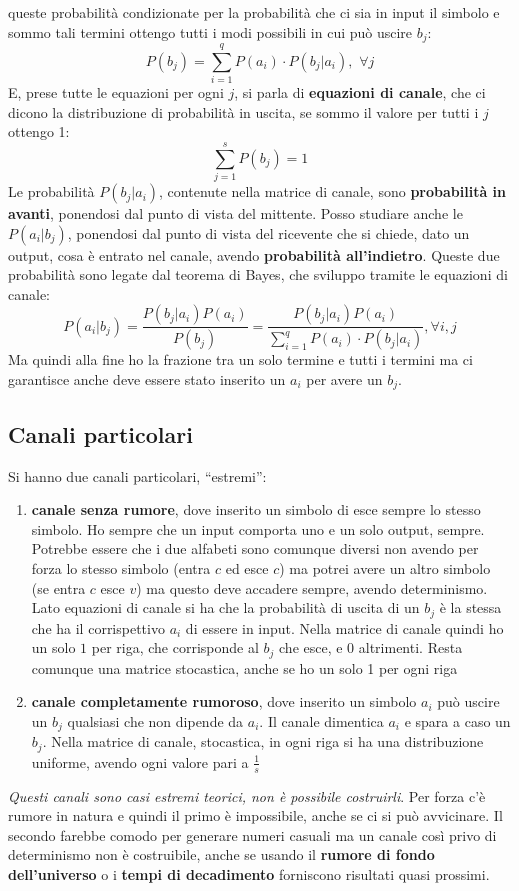 \documentclass[a4paper,12pt, oneside]{book}
\begin{document}
queste probabilità condizionate per la probabilità che ci sia in input il
simbolo e sommo tali termini ottengo tutti i modi possibili in cui può uscire
$b_j$:
\[P(b_j)=\sum_{i=1}^q P(a_i)\cdot P(b_j|a_i),\,\,\forall j\]
E, prese tutte le equazioni per ogni $j$, si parla di \textbf{equazioni di
  canale}, che ci dicono la distribuzione di probabilità in uscita, se sommo il
valore per tutti i $j$ ottengo 1:
\[\sum_{j=1}^s P(b_j)=1\]
Le probabilità $P(b_j|a_i)$, contenute nella matrice di canale, sono
\textbf{probabilità in avanti}, ponendosi dal punto di vista del mittente. Posso
studiare anche le $P(a_i|b_j)$, ponendosi dal 
punto di vista del ricevente che si chiede, dato un output, cosa è entrato nel
canale, avendo \textbf{probabilità all'indietro}. Queste due probabilità
sono legate dal teorema di Bayes, che sviluppo tramite le equazioni di canale:
\[P(a_i|b_j)=\frac{P(b_j|a_i)P(a_i)}{P(b_j)}=\frac{P(b_j|a_i)P(a_i)}{\sum_{i=1}^q
    P(a_i)\cdot P(b_j|a_i)},\forall i,j\]
Ma quindi alla fine ho la frazione tra un solo termine e tutti i termini ma ci
garantisce anche deve essere stato inserito un $a_i$ per avere un $b_j$.
\subsection{Canali particolari}
Si hanno due canali particolari, ``estremi'':
\begin{enumerate}
  \item \textbf{canale senza rumore}, dove inserito un simbolo di esce
  sempre lo stesso simbolo. Ho sempre che un input comporta uno e un solo
  output, sempre. Potrebbe essere che i due alfabeti sono comunque diversi non
  avendo per forza lo stesso simbolo (entra $c$ ed esce $c$) ma potrei avere un
  altro simbolo (se entra $c$ esce $v$) ma questo deve accadere sempre, avendo
  determinismo. Lato equazioni di canale si ha che la probabilità di uscita di 
  un $b_j$ è la stessa che ha il corrispettivo $a_i$ di essere in input. Nella
  matrice di canale quindi ho un solo $1$ per riga, che corrisponde al $b_j$ che
  esce, e 0 altrimenti. Resta comunque una matrice stocastica, anche se ho un
  solo 1 per ogni riga
  \item \textbf{canale completamente rumoroso}, dove inserito un simbolo $a_i$
  può uscire un $b_j$ qualsiasi che non dipende da $a_i$. Il canale dimentica
  $a_i$ e spara a caso un $b_j$. Nella matrice di canale, stocastica, in ogni
  riga si ha una 
  distribuzione uniforme, avendo ogni valore pari a $\frac{1}{s}$
\end{enumerate}
\textit{Questi canali sono casi estremi teorici, non è possibile
  costruirli}. Per forza c'è rumore in natura e quindi il primo è
impossibile, anche se ci si può avvicinare. Il secondo farebbe comodo per
generare numeri casuali ma un canale 
così privo di determinismo non è costruibile, anche se usando il \textbf{rumore
  di fondo dell'universo} o i \textbf{tempi di decadimento} forniscono risultati
quasi prossimi.
\end{document}
